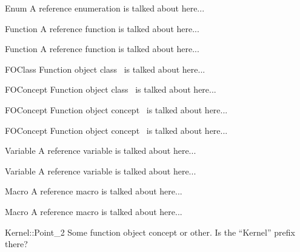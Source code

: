 \begin{ccRefEnum}{Enum}
A reference enumeration is talked about here...
\end{ccRefEnum}

\begin{ccRefFunction}[Class::]{Function}
A reference function is talked about here...
\end{ccRefFunction}

\begin{ccRefFunction}{Function}
A reference function is talked about here...
\end{ccRefFunction}

\begin{ccRefFunctionObjectClass}{FOClass}
Function object class \ccRefName\ is talked about here...
\end{ccRefFunctionObjectClass}

\begin{ccRefFunctionObjectClass}[Kernel::]{FOConcept}
Function object class \ccRefScope\ccRefName\ is talked about here...
\end{ccRefFunctionObjectClass}

\begin{ccRefFunctionObjectConcept}{FOConcept}
Function object concept \ccRefName\ is talked about here...
\end{ccRefFunctionObjectConcept}

\begin{ccRefFunctionObjectConcept}[Kernel::]{FOConcept}
Function object concept \ccRefScope\ccRefName\ is talked about here...
\end{ccRefFunctionObjectConcept}

\begin{ccRefVariable}[Class::]{Variable}
A reference variable is talked about here...
\end{ccRefVariable}

\begin{ccRefVariable}{Variable}
A reference variable is talked about here...
\end{ccRefVariable}

\begin{ccRefMacro}[Class::]{Macro}
A reference macro is talked about here...
\end{ccRefMacro}

\begin{ccRefMacro}{Macro}
A reference macro is talked about here...
\end{ccRefMacro}

\begin{ccRefFunctionObjectConcept}{Kernel::Point_2}
Some function object concept or other.  Is the ``Kernel'' prefix there?
\end{ccRefFunctionObjectConcept}

